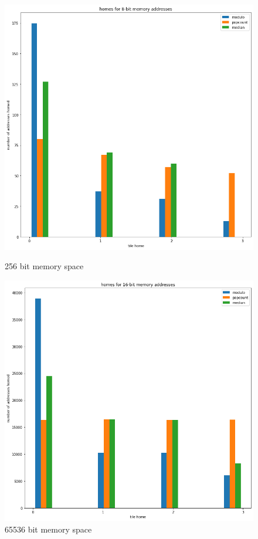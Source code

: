 \begin{figure}[h]
  \centering
  \begin{minipage}[b]{0.4\textwidth}
    \includegraphics[width=\textwidth]{figures/homes.png}
    \caption{256 bit memory space}
    \label{Fig:homes}
  \end{minipage}
  \hfill
  \begin{minipage}[b]{0.4\textwidth}
    \includegraphics[width=\textwidth]{figures/homes2.png}
    \caption{65536 bit memory space }
    \label{Fig:homes2}
  \end{minipage}
\end{figure}

